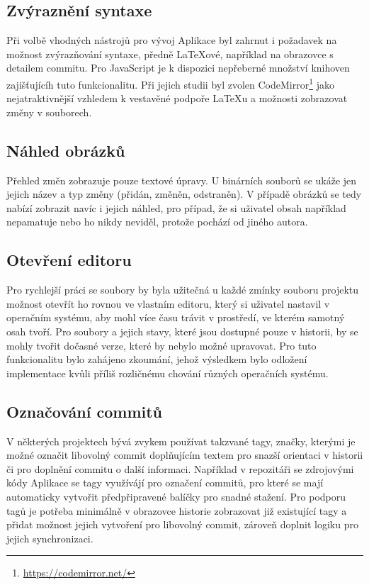 \subsection{Zvýraznění syntaxe}

Při volbě vhodných nástrojů pro vývoj Aplikace byl zahrnut i požadavek na možnost zvýrazňování syntaxe, předně \LaTeX{ové}, například na obrazovce s detailem commitu. Pro JavaScript je k dispozici nepřeberné množství knihoven zajišťujícíh tuto funkcionalitu. Při jejich studii byl zvolen CodeMirror\footnote{\url{https://codemirror.net/}} jako nejatraktivnější vzhledem k vestavěné podpoře \LaTeX{u} a možnosti zobrazovat změny v souborech.

\subsection{Náhled obrázků}

Přehled změn zobrazuje pouze textové úpravy. U binárních souborů se ukáže jen jejich název a typ změny (přidán, změněn, odstraněn). V případě obrázků se tedy nabízí zobrazit navíc i jejich náhled, pro případ, že si uživatel obsah například nepamatuje nebo ho nikdy neviděl, protože pochází od jiného autora.

\subsection{Otevření editoru}

Pro rychlejší práci se soubory by byla užitečná u každé zmínky souboru projektu možnost otevřít ho rovnou ve vlastním editoru, který si uživatel nastavil v operačním systému, aby mohl více času trávit v prostředí, ve kterém samotný osah tvoří. Pro soubory a jejich stavy, které jsou dostupné pouze v historii, by se mohly tvořit dočasné verze, které by nebylo možné upravovat. Pro tuto funkcionalitu bylo zahájeno zkoumání, jehož výsledkem bylo odložení implementace kvůli příliš rozličnému chování různých operačních systému.

\subsection{Označování commitů}

V některých projektech bývá zvykem používat takzvané tagy, značky, kterými je možné označit libovolný commit doplňujícím textem pro snazší orientaci v historii či pro doplnění commitu o další informaci. Například v repozitáři se zdrojovými kódy Aplikace se tagy využívájí pro označení commitů, pro které se mají automaticky vytvořit předpřipravené balíčky pro snadné stažení. Pro podporu tagů je potřeba minimálně v obrazovce historie zobrazovat již existující tagy a přidat možnost jejich vytvoření pro libovolný commit, zároveň doplnit logiku pro jejich synchronizaci.

